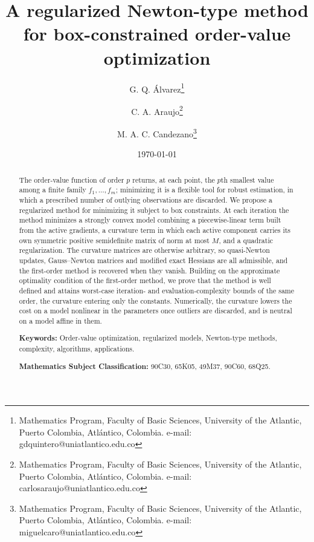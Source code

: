 \documentclass[11pt]{article}
\newcounter{alg}[section]
\begin{document}
\title{A regularized Newton-type method for box-constrained order-value optimization}

\author{
    G. Q. Álvarez\thanks{Mathematics Program, Faculty of Basic Sciences, University of the Atlantic, Puerto Colombia, Atlántico, Colombia. e-mail: gdquintero@uniatlantico.edu.co}
    \and 
    C. A. Araujo\thanks{Mathematics Program, Faculty of Basic Sciences, University of the Atlantic, Puerto Colombia, Atlántico, Colombia. e-mail: carlosaraujo@uniatlantico.edu.co}
    \and
    M. A. C. Candezano\thanks{Mathematics Program, Faculty of Basic Sciences, University of the Atlantic, Puerto Colombia, Atlántico, Colombia. e-mail: miguelcaro@uniatlantico.edu.co}
}

\date{\today}
\maketitle

\begin{abstract}
The order-value function of order $p$ returns, at each point, the $p$th
smallest value among a finite family $f_1,\dots,f_m$; minimizing it is a
flexible tool for robust estimation, in which a prescribed number of outlying
observations are discarded. We propose a regularized method for minimizing it
subject to box constraints. At each iteration the method minimizes a strongly
convex model combining a piecewise-linear term built from the active gradients,
a curvature term in which each active component carries its own symmetric
positive semidefinite matrix of norm at most $M$, and a quadratic
regularization. The curvature matrices are otherwise arbitrary, so quasi-Newton
updates, Gauss--Newton matrices and modified exact Hessians are all admissible,
and the first-order method is recovered when they vanish. Building on the
approximate optimality condition of the first-order method, we prove that the
method is well defined and attains worst-case iteration- and
evaluation-complexity bounds of the same order, the curvature entering only the
constants. Numerically, the curvature lowers the cost on a model nonlinear in
the parameters once outliers are discarded, and is neutral on a model affine in
them.

\medskip
\noindent
\textbf{Keywords:} Order-value optimization, regularized models,
Newton-type methods, complexity, algorithms, applications.

\medskip
\noindent
\textbf{Mathematics Subject Classification:} 90C30, 65K05, 49M37, 90C60, 68Q25.
\end{abstract}
\end{document}
